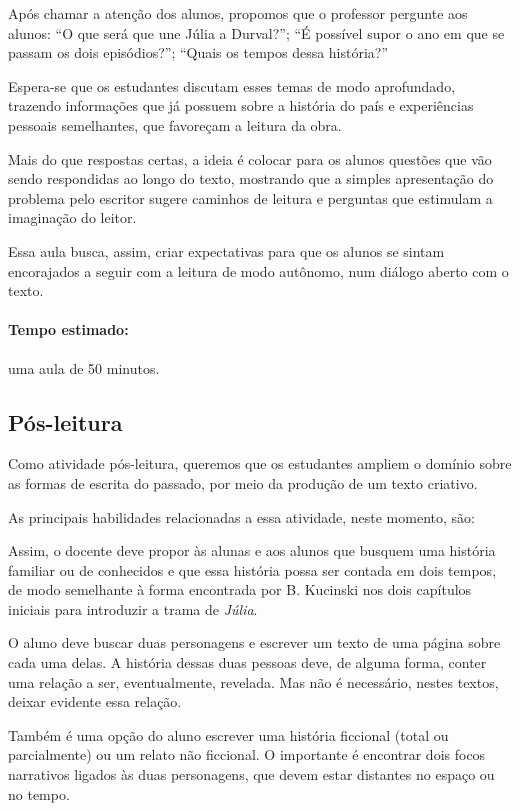 \documentclass[12pt]{extarticle}
\begin{document}
Após chamar a atenção dos alunos, propomos que o professor pergunte aos
alunos: ``O que será que une Júlia a Durval?''; ``É possível supor o ano
em que se passam os dois episódios?''; ``Quais os tempos dessa
história?''

Espera-se que os estudantes discutam esses temas de modo aprofundado,
trazendo informações que já possuem sobre a história do país e
experiências pessoais semelhantes, que favoreçam a leitura da obra.

Mais do que respostas certas, a ideia é colocar para os alunos questões
que vão sendo respondidas ao longo do texto, mostrando que a simples
apresentação do problema pelo escritor sugere caminhos de leitura e
perguntas que estimulam a imaginação do leitor.

Essa aula busca, assim, criar expectativas para que os alunos se sintam
encorajados a seguir com a leitura de modo autônomo, num diálogo aberto
com o texto.

\paragraph{Tempo estimado:} uma aula de 50 minutos.

\subsection{Pós-leitura}

Como atividade pós-leitura, queremos que os estudantes ampliem o domínio
sobre as formas de escrita do passado, por meio da produção de um texto
criativo.

As principais habilidades relacionadas a essa atividade, neste momento, são:

Assim, o docente deve propor às alunas e aos alunos que busquem uma
história familiar ou de conhecidos e que essa história possa ser contada
em dois tempos, de modo semelhante à forma encontrada por B. Kucinski
nos dois capítulos iniciais para introduzir a trama de \emph{Júlia}.

O aluno deve buscar duas personagens e escrever um texto de uma página
sobre cada uma delas. A história dessas duas pessoas deve, de alguma
forma, conter uma relação a ser, eventualmente, revelada. Mas não é
necessário, nestes textos, deixar evidente essa relação.

Também é uma opção do aluno escrever uma história ficcional (total ou
parcialmente) ou um relato não ficcional. O importante é encontrar dois
focos narrativos ligados às duas personagens, que devem estar distantes
no espaço ou no tempo.
\end{document}
